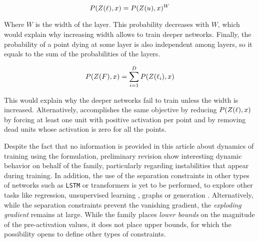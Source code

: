 \begin{equation}
    P(Z(\ell), x) = P(Z(u), x)^W
\end{equation}

Where $W$ is the width of the layer. This probability decreases with $W$, which would explain why increasing width allows to train deeper networks. Finally, the probability of a point dying at some layer is also independent among layers, so it equals to the sum of the probabilities of the layers.

\begin{equation}
    P(Z(F), x) = \sum_{i=1}^D P(Z(\ell_i), x)
\end{equation}

This would explain why the deeper networks fail to train unless the width is increased. Alternatively, \SepUnitPoint accomplishes the same objective by reducing $P(Z(\ell), x)$ by forcing at least one unit with positive activation per point and by removing dead units whose activation is zero for all the points.

Despite the fact that no information is provided in this article about dynamics of training using the \SepConstraint formulation, preliminary revision show interesting dynamic behavior on behalf of the \SepConstraint family, particularly regarding instabilities that appear during training. In addition, the use of the separation constraints in other types of networks such as \texttt{LSTM} \cite{lstm} or transformers \cite{transformer}\cite{transformer2} is yet to be performed, to explore other tasks like regression, unsupervised learning \cite{embedding}, graphs \cite{graph} or generation \cite{gan,vae}. Alternatively, while the separation constraints prevent the vanishing gradient, the \emph{exploding gradient} remains at large. While the \SepConstraint family places \emph{lower bounds} on the magnitude of the pre-activation values, it does not place upper bounds, for which the possibility opens to define other types of constraints. 
\\\\







